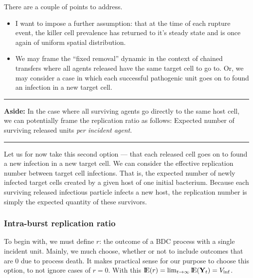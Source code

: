 There are a couple of points to address.
\begin{itemize}
\item I want to impose a further assumption: that at the time of each rupture event, the killer cell prevalence has returned to it's steady state and is once again of uniform spatial distribution.

\item We may frame the ``fixed removal'' dynamic in the context of chained transfers where all agents released have the same target cell to go to. Or, we may consider a case in which each successful pathogenic unit goes on to found an infection in a new target cell. 
\end{itemize}

\vspace{10pt}


\hrule
\vspace{5pt}

\noindent
\textbf{Aside:} In the case where all surviving agents go directly to the same host cell, we can potentially frame the replication ratio as follows: Expected number of surviving released units \textit{per incident agent}. 
\hrule
\vspace{8pt}


\vspace{10pt}


\noindent
Let us for now take this second option --- that each released cell goes on to found a new infection in a new target cell. We can consider the effective replication number between target cell infections. That is, the expected number of newly infected target cells created by a given host of one initial bacterium. Because each surviving released infectious particle infects a new host, the replication number is simply the expected quantity of these survivors. 

\subsubsection{Intra-burst replication ratio}
To begin with, we must define $r$: the outcome of a BDC process with a single incident unit. Mainly, we much choose, whether or not to include outcomes that are 0 due to process death. It makes practical sense for our purpose to choose this option, to not ignore cases of $r = 0$. With this ${\rm I}\!{\rm E}(r) = \lim_{t\to\infty} {\rm I}\!{\rm E}({{\bf Y}_t}) = V_{\text{inf}}$.\par

